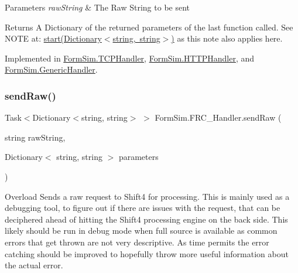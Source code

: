 \begin{DoxyParams}{Parameters}
{\em raw\+String} & The Raw String to be sent\\
\hline
\end{DoxyParams}
\begin{DoxyReturn}{Returns}
A Dictionary of the returned parameters of the last function called. See N\+O\+TE at\+: \mbox{\hyperlink{interface_form_sim_1_1_f_r_c___handler_a2a2a8a776e774e5f8b5e2b7e623a26a6}{start(\+Dictionary$<$string, string$>$)}} as this note also applies here.
\end{DoxyReturn}


Implemented in \mbox{\hyperlink{class_form_sim_1_1_t_c_p_handler_a810309bc6e943b6ff12ebed8401613f0}{Form\+Sim.\+T\+C\+P\+Handler}}, \mbox{\hyperlink{class_form_sim_1_1_h_t_t_p_handler_a31006e646afd7cb331784dce27760d5b}{Form\+Sim.\+H\+T\+T\+P\+Handler}}, and \mbox{\hyperlink{class_form_sim_1_1_generic_handler_a806d781f9ad046f8f1574b137ffe86e0}{Form\+Sim.\+Generic\+Handler}}.

\mbox{\label{interface_form_sim_1_1_f_r_c___handler_ad4b9146b6142d1d6ded15e5de4ed4675}} 
\subsubsection{\texorpdfstring{send\+Raw()}{sendRaw()}\hspace{0.1cm}{\footnotesize\ttfamily [2/2]}}
{\footnotesize\ttfamily Task$<$Dictionary$<$string, string$>$ $>$ Form\+Sim.\+F\+R\+C\+\_\+\+Handler.\+send\+Raw (\begin{DoxyParamCaption}\item[{string}]{raw\+String,  }\item[{Dictionary$<$ string, string $>$}]{parameters }\end{DoxyParamCaption})}



Overload Sends a raw request to Shift4 for processing. This is mainly used as a debugging tool, to figure out if there are issues with the request, that can be deciphered ahead of hitting the Shift4 processing engine on the back side. This likely should be run in debug mode when full source is available as common errors that get thrown are not very descriptive. As time permits the error catching should be improved to hopefully throw more useful information about the actual error. 


